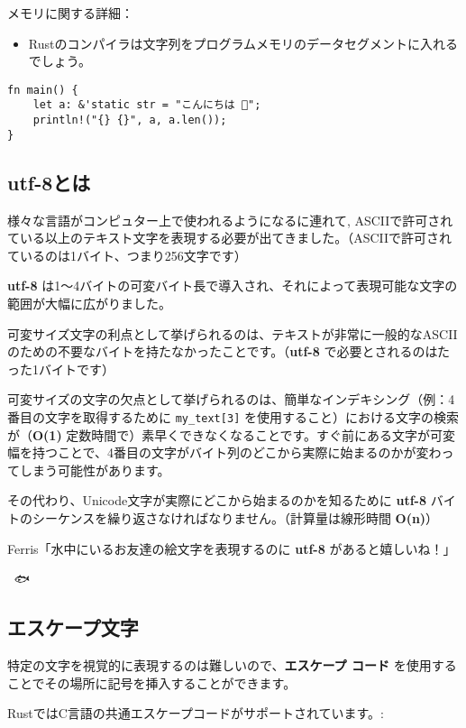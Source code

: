 メモリに関する詳細：

\begin{itemize}
\item
  Rustのコンパイラは文字列をプログラムメモリのデータセグメントに入れるでしょう。
\end{itemize}

\begin{verbatim}
fn main() {
    let a: &'static str = "こんにちは 🦀";
    println!("{} {}", a, a.len());
}
\end{verbatim}

\subsection{utf-8とは}

様々な言語がコンピュター上で使われるようになるに連れて,
ASCIIで許可されている以上のテキスト文字を表現する必要が出てきました。（ASCIIで許可されているのは1バイト、つまり256文字です）

\textbf{utf-8}
は1～4バイトの可変バイト長で導入され、それによって表現可能な文字の範囲が大幅に広がりました。

可変サイズ文字の利点として挙げられるのは、テキストが非常に一般的なASCIIのための不要なバイトを持たなかったことです。（\textbf{utf-8}
で必要とされるのはたった1バイトです）

可変サイズの文字の欠点として挙げられるのは、簡単なインデキシング（例：4番目の文字を取得するために
\texttt{my\_text{[}3{]}}
を使用すること）における文字の検索が（\textbf{O(1)}
定数時間で）素早くできなくなることです。すぐ前にある文字が可変幅を持つことで、4番目の文字がバイト列のどこから実際に始まるのかが変わってしまう可能性があります。

その代わり、Unicode文字が実際にどこから始まるのかを知るために
\textbf{utf-8}
バイトのシーケンスを繰り返さなければなりません。（計算量は線形時間
\textbf{O(n)}）

Ferris「水中にいるお友達の絵文字を表現するのに \textbf{utf-8}
があると嬉しいね！」

🐠🐙🐟🐬🐋

\subsection{エスケープ文字}

特定の文字を視覚的に表現するのは難しいので、\textbf{エスケープ コード}
を使用することでその場所に記号を挿入することができます。

RustではC言語の共通エスケープコードがサポートされています。:


